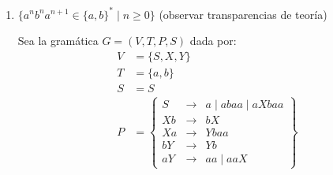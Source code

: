 \begin{ejercicio}
\begin{enumerate}
        \item $\{a^nb^na^{n+1} \in \{a,b\}^\ast \mid n\geq 0\}$ (observar transparencias de teoría)
        
        Sea la gramática $G=\left(V,T,P,S\right)$ dada por:
        \begin{align*}
            V &= \{S, X, Y\} \\
            T &= \{a,b\} \\
            S &= S \\
            P &= \left\{
                \begin{array}{rcl}
                    S &\rightarrow & a\mid abaa\mid aXbaa\\
                    Xb & \rightarrow & bX\\
                    Xa & \rightarrow & Ybaa\\
                    bY & \rightarrow & Yb\\
                    aY & \rightarrow & aa\mid aaX
                \end{array}
            \right\}
        \end{align*}
    \end{enumerate}
\end{ejercicio}



